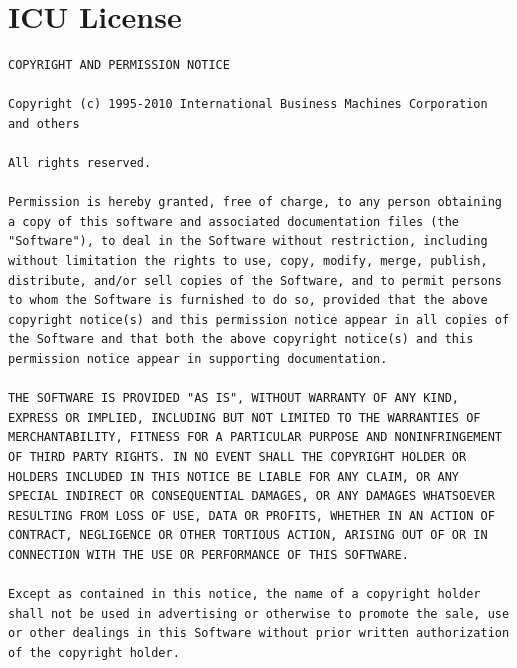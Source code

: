\documentclass[10pt, headsepline,DIV14,BCOR0.5cm]{scrreprt}
\begin{document}
\section{ICU License}

\begin{lstlisting}
COPYRIGHT AND PERMISSION NOTICE

Copyright (c) 1995-2010 International Business Machines Corporation and others

All rights reserved.

Permission is hereby granted, free of charge, to any person obtaining a copy of this software and associated documentation files (the "Software"), to deal in the Software without restriction, including without limitation the rights to use, copy, modify, merge, publish, distribute, and/or sell copies of the Software, and to permit persons to whom the Software is furnished to do so, provided that the above copyright notice(s) and this permission notice appear in all copies of the Software and that both the above copyright notice(s) and this permission notice appear in supporting documentation.

THE SOFTWARE IS PROVIDED "AS IS", WITHOUT WARRANTY OF ANY KIND, EXPRESS OR IMPLIED, INCLUDING BUT NOT LIMITED TO THE WARRANTIES OF MERCHANTABILITY, FITNESS FOR A PARTICULAR PURPOSE AND NONINFRINGEMENT OF THIRD PARTY RIGHTS. IN NO EVENT SHALL THE COPYRIGHT HOLDER OR HOLDERS INCLUDED IN THIS NOTICE BE LIABLE FOR ANY CLAIM, OR ANY SPECIAL INDIRECT OR CONSEQUENTIAL DAMAGES, OR ANY DAMAGES WHATSOEVER RESULTING FROM LOSS OF USE, DATA OR PROFITS, WHETHER IN AN ACTION OF CONTRACT, NEGLIGENCE OR OTHER TORTIOUS ACTION, ARISING OUT OF OR IN CONNECTION WITH THE USE OR PERFORMANCE OF THIS SOFTWARE.

Except as contained in this notice, the name of a copyright holder shall not be used in advertising or otherwise to promote the sale, use or other dealings in this Software without prior written authorization of the copyright holder. 

\end{lstlisting}
\end{document}
